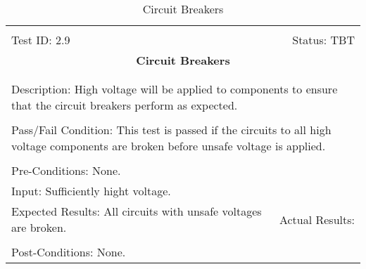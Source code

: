 \documentclass[titlepage]{article}
\begin{document}
\begin{center}%
\begin{table}
\begin{tabular}{|l r|}\hline&\\[-2mm]
	Test ID: 2.9	&Status: TBT\\[-3mm]
	\multicolumn{2}{|c|}{\textbf{\large{Circuit Breakers}}}\\&\\\hline&\\[-3mm]
	\multicolumn{2}{|p{\textwidth}|}{Description: High voltage will be applied to components to ensure that the circuit breakers perform as expected.}\\[1mm]\hline&\\[-3mm]
	\multicolumn{2}{|p{\textwidth}|}{Pass/Fail Condition: This test is passed if the circuits to all high voltage components are broken before unsafe voltage is applied.}\\[1mm]\hline&\\[-3mm]
	\multicolumn{2}{|p{\textwidth}|}{Pre-Conditions: None.}\\[4mm]
	\multicolumn{2}{|p{\textwidth}|}{Input: Sufficiently hight voltage.}\\[2mm]\hline
	\multicolumn{1}{|p{0.49\textwidth}}{Expected Results: All circuits with unsafe voltages are broken.}	&\multicolumn{1}{|p{0.45\textwidth}|}{Actual Results:}\\\hline&\\[-3mm]
	\multicolumn{2}{|p{\textwidth}|}{Post-Conditions: None.}\\\hline
\end{tabular}
\caption{Circuit Breakers}
\end{table}
\end{center}
\end{document}
